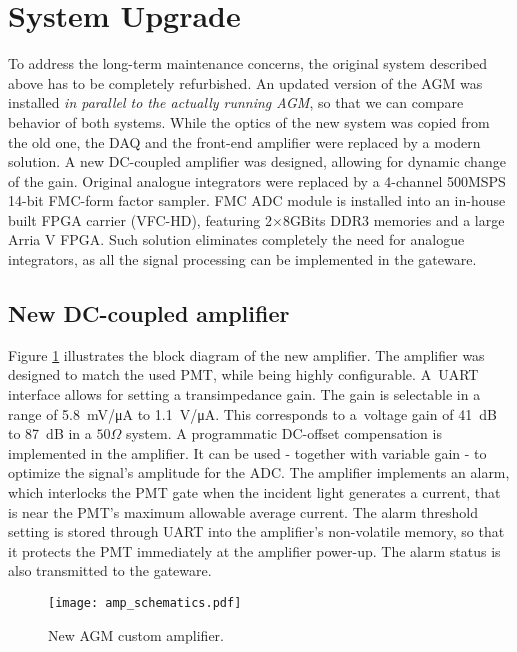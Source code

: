 \section{System Upgrade}
To address the long-term maintenance concerns, the original system described above has to be completely refurbished. 
%
An updated version of the AGM was installed \textit{in parallel to the actually running AGM}, so that we can compare behavior of both systems.
%
While the optics of the new system was copied from the old one, the DAQ and the front-end amplifier were replaced by a modern solution.
%
A new DC-coupled amplifier was designed, allowing for dynamic change of the gain.
%
Original analogue integrators were replaced by a 4-channel 500MSPS 14-bit FMC-form factor sampler.
%
FMC ADC module is installed into an in-house built FPGA carrier (VFC-HD), featuring 2$\times 8$GBits DDR3 memories and a large Arria V FPGA.
%
Such solution eliminates completely the need for analogue integrators, as all the signal processing can be implemented in the gateware.  

\subsection{New DC-coupled amplifier}

Figure \ref{fig:amp_schematics} illustrates the block diagram of the new amplifier.
%
The amplifier was designed to match the used PMT, while being highly configurable.
%
A~UART interface allows for setting a transimpedance gain.
%
The gain is selectable in a range of \SI{5.8}{mV/\micro A} to \SI{1.1}{V/\micro A}.
%
This corresponds to a~voltage gain of \SI{41}{dB} to \SI{87}{dB} in a $50\Omega$ system.
%
A programmatic DC-offset compensation is implemented in the amplifier.
%
It can be used - together with variable gain - to optimize the signal's amplitude for the ADC.
%
The amplifier implements an alarm, which interlocks the PMT gate when the incident light generates a current, that is near the PMT's maximum allowable average current.
%
The alarm threshold setting is stored through UART into the amplifier's non-volatile memory, so that it protects the PMT immediately at the amplifier power-up.
%
The alarm status is also transmitted to the gateware.
%
\begin{figure}[!tbh]
    \centering
    \texttt{[image: amp\_schematics.pdf]}
    \caption{New AGM custom amplifier.}
    \label{fig:amp_schematics}
\end{figure}
%

